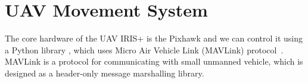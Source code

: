 \documentclass[conference]{IEEEtran}
\newcommand{\R}{\mathbb R}
\begin{document}
%

\section{UAV Movement System}
\label{sec:uav}


The core hardware of the UAV IRIS+ is the Pixhawk and we can control it using a Python library \cite{dronekit}, which uses Micro Air Vehicle Link (MAVLink) protocol~\cite{meier2011pixhawk}. MAVLink is a protocol for communicating with small unmanned vehicle, which is designed as a header-only message marshalling library.
\end{document}

